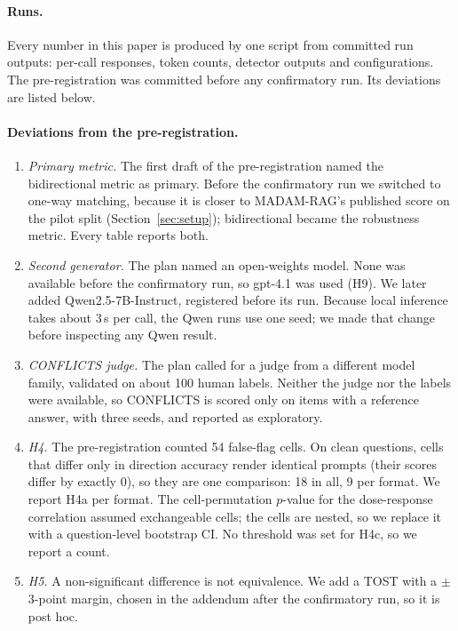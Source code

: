 \label{app:repro}
\paragraph{Runs.} Every number in this paper is produced by one script from committed run outputs: per-call responses,
token counts, detector outputs and configurations. The pre-registration was committed before any confirmatory run.
Its deviations are listed below.

\paragraph{Deviations from the pre-registration.}
\begin{enumerate}[leftmargin=*,itemsep=1pt,topsep=2pt]
\item \emph{Primary metric.} The first draft of the pre-registration named the bidirectional metric as primary. Before
the confirmatory run we switched to one-way matching, because it is closer to MADAM-RAG's published score on the pilot
split (Section~\ref{sec:setup}); bidirectional became the robustness metric. Every table reports both.
\item \emph{Second generator.} The plan named an open-weights model. None was available before the confirmatory run, so
gpt-4.1 was used (H9). We later added Qwen2.5-7B-Instruct, registered before its run. Because local inference
takes about 3\,s per call, the Qwen runs use one seed; we made that change before inspecting any Qwen result.
\item \emph{CONFLICTS judge.} The plan called for a judge from a different model family, validated on about 100 human
labels. Neither the judge nor the labels were available, so CONFLICTS is scored only on items with a reference answer,
with three seeds, and reported as exploratory.
\item \emph{H4.} The pre-registration counted 54 false-flag cells. On clean questions, cells that differ only in
direction accuracy render identical prompts (their scores differ by exactly 0), so they are one comparison: 18 in
all, 9 per format. We report H4a per format. The cell-permutation $p$-value for the dose-response correlation assumed
exchangeable cells; the cells are nested, so we replace it with a question-level bootstrap CI. No threshold was set
for H4c, so we report a count.
\item \emph{H5.} A non-significant difference is not equivalence. We add a TOST with a $\pm$3-point margin, chosen in
the addendum after the confirmatory run, so it is post hoc.

\end{enumerate}
